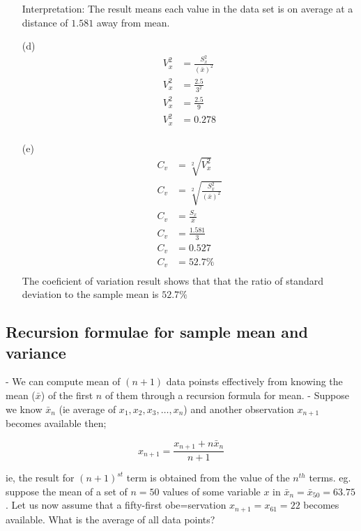 \documentclass[12pt]{article}
\begin{document}
\begin{enumerate}
        Interpretation: The result means each value in the data set is on average at a distance of $1.581$ away from mean.
    \item[(d)]
        \begin{align*}
            V_x^2 & = \frac{S_x^2}{(\bar{x})^2} \\
            V_x^2 & = \frac{2.5}{3^2}           \\
            V_x^2 & = \frac{2.5}{9}             \\
            V_x^2 & = 0.278                     \\
        \end{align*}
    \item[(e)]
        \begin{align*}
            C_v & = \sqrt[2]{V_x^2}                     \\
            C_v & = \sqrt[2]{\frac{S_x^2}{(\bar{x})^2}} \\
            C_v & = \frac{S_x}{\bar{x}}                 \\
            C_v & = \frac{1.581}{3}                     \\
            C_v & = 0.527                               \\
            C_v & = 52.7\%                              \\
        \end{align*}
        The coeficient of variation result shows that that the ratio of standard deviation to the sample mean is $52.7\%$
\end{enumerate}
\subsection{Recursion formulae for sample mean and variance}
- We can compute mean of $(n + 1)$ data poinsts effectively from knowing the mean ($\bar{x}$) of the first $n$ of them through a recursion formula for mean.
- Suppose we know $\bar{x}_{n}$ (ie average of $x_1, x_2, x_3, \dots, x_n$) and another observation $x_{n+1}$ becomes available then;

\begin{equation}
    x_{n + 1} = \frac{x_{n+1} + n\bar{x}_n}{n + 1}
\end{equation}

ie, the result for $(n + 1)^{st}$ term is obtained from the value of the $n^{th}$ terms.
eg. suppose the mean of a set of $n = 50$ values of some variable $x$ in $\bar{x}_n = \bar{x}_{50} = 63.75$. Let us now assume that a fifty-first obe=servation $x_{n + 1} = x_{61} = 22$ becomes available. What is the average of all data points?
\end{document}
